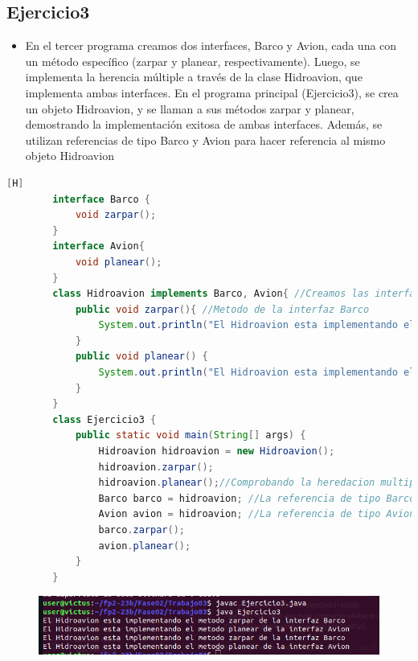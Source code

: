 \documentclass{article}
\begin{document}
	\subsection{Ejercicio3}
	\begin{itemize}	
		\item En el tercer programa creamos dos interfaces, Barco y Avion, cada una con un método específico (zarpar y planear, respectivamente). Luego, se implementa la herencia múltiple a través de la clase Hidroavion, que implementa ambas interfaces. En el programa principal (Ejercicio3), se crea un objeto Hidroavion, y se llaman a sus métodos zarpar y planear, demostrando la implementación exitosa de ambas interfaces. Además, se utilizan referencias de tipo Barco y Avion para hacer referencia al mismo objeto Hidroavion
	\end{itemize}	
	\begin{lstlisting}[language=java,caption={Las lineas de codigos del metodo creado:}][H]
		interface Barco {
			void zarpar();
		}
		interface Avion{
			void planear();
		}
		class Hidroavion implements Barco, Avion{ //Creamos las interfaces como una herdacion multiple la cual Hidroavion tiene esta condicion donde este puede aplicar metodos de las interfaces creadas
			public void zarpar(){ //Metodo de la interfaz Barco
				System.out.println("El Hidroavion esta implementando el metodo zarpar de la interfaz Barco");
			} 
			public void planear() {
				System.out.println("El Hidroavion esta implementando el metodo planear de la interfaz Avion");
			} 
		}
		class Ejercicio3 {
			public static void main(String[] args) {
				Hidroavion hidroavion = new Hidroavion();
				hidroavion.zarpar();
				hidroavion.planear();//Comprobando la heredacion multiple por interfaces la cual creamos a un objeto hidroavion que usara metodos de las interfaces de la cual se hereda
				Barco barco = hidroavion; //La referencia de tipo Barco para hacer referencia a una instancia de Hidroavion.
				Avion avion = hidroavion; //La referencia de tipo Avion para hacer referencia a una instancia de Hidroavion.
				barco.zarpar();
				avion.planear();
			}
		}
	\end{lstlisting}
	\begin{figure}[H]
		\centering
		\includegraphics[width=1.0\textwidth,keepaspectratio]{img/Captura3.png}
	\end{figure}
\end{document}

